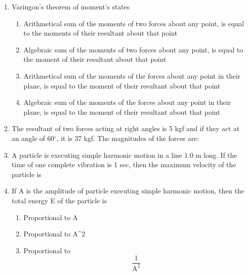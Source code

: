 \documentclass[11pt,a4paper]{article}
\begin{document}
\begin{enumerate}
\item{Varingon's theorem of moment's states
}
\begin{enumerate}[label=\Alph*.]
\item{Arithmetical sum of the moments of two forces about any point, is equal to the moments of their resultant about that point}
\item{Algebraic sum of the moments of two forces about any point, is equal to the moment of their resultant about that point}
\item{Arithmetical sum of the moments of the forces about any point in their plane, is equal to the moment of their resultant about that point}
\item{Algebraic sum of the moments of the forces about any point in their plane, is equal to the moment of their resultant about that point}
\end{enumerate}
\item{The resultant of two forces acting at right angles is 5 kgf and if they act at an angle of 60$^\circ$, it is 37 kgf. The magnitudes of the forces are:
}
\\
\item{A particle is executing simple harmonic motion in a line 1.0 m long. If the time of one complete vibration is 1 sec, then the maximum velocity of the particle is}
\\
\item{If A is the amplitude of particle executing simple harmonic motion, then the total energy E of the particle is}
\begin{enumerate}[label=\Alph*.]
\item{Proportional to A}
\item{Proportional to A\^{}2}
\item{Proportional to $$\frac{1}{{{{\text{A}}^2}}}$$}

\end{enumerate}
\end{enumerate}
\end{document}
